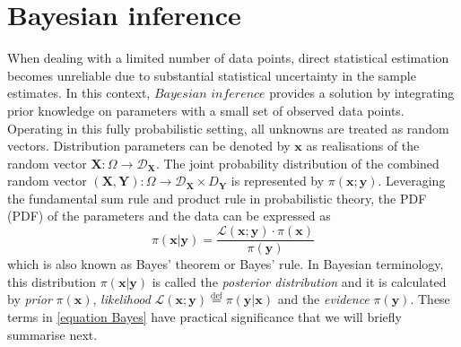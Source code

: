 \label{ch:Bayesian}


\section{Bayesian inference}

When dealing with a limited number of data points, direct statistical estimation becomes unreliable due to substantial statistical uncertainty in the sample estimates. In this context, $\textit{Bayesian inference}$ provides a solution by integrating prior knowledge on parameters with a small set of observed data points. Operating in this fully probabilistic setting, all unknowns are treated as random vectors. Distribution parameters can be denoted by $\boldsymbol{x}$ as realisations of the random vector $\boldsymbol{X}:\Omega \rightarrow \mathcal{D}_{\boldsymbol{X}}$. The joint probability distribution of the combined random vector $(\boldsymbol{X},\boldsymbol{Y}):\Omega \rightarrow \mathcal{D}_{\boldsymbol{X}} \times {D}_{\boldsymbol{Y}}$ is represented by $\pi(\boldsymbol{x};\boldsymbol{y})$. Leveraging the fundamental sum rule and product rule in probabilistic theory, the \acrlong{PDF} (\acrshort{PDF}) of the parameters and the data can be expressed as
\begin{equation}
\pi(\boldsymbol{x}|\boldsymbol{y}) = \frac{{\mathcal{L}(\boldsymbol{x};\boldsymbol{y}) \cdot \pi(\boldsymbol{x})}}{{\pi(\boldsymbol{y})}} \label{equation Bayes}
\end{equation}
which is also known as Bayes' theorem or Bayes' rule. In Bayesian terminology, this distribution $\pi(\boldsymbol{x}|\boldsymbol{y})$ is called the \textit{posterior distribution} and it is calculated by \textit{prior} $\pi(\boldsymbol{x})$, \textit{likelihood} $\mathcal{L}(\boldsymbol{x};\boldsymbol{y})\stackrel{\mathrm{def}}{=}\pi(\boldsymbol{y}|\boldsymbol{x})$
and the \textit{evidence} $\pi(\boldsymbol{y})$. These terms in \cref{equation Bayes} have practical significance that we will briefly summarise next.

